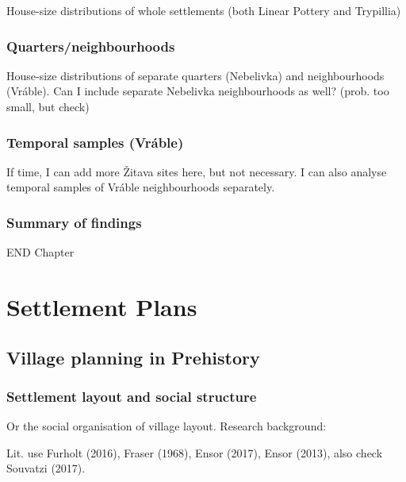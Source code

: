 \documentclass[
  12pt,
]{book}
\begin{document}
House-size distributions of whole settlements (both Linear Pottery and Trypillia)

\hypertarget{quartersneighbourhoods}{%
\section{Quarters/neighbourhoods}\label{quartersneighbourhoods}}

House-size distributions of separate quarters (Nebelivka) and neighbourhoods (Vráble). Can I include separate Nebelivka neighbourhoods as well? (prob. too small, but check)

\hypertarget{temporal-samples-vruxe1ble}{%
\section{Temporal samples (Vráble)}\label{temporal-samples-vruxe1ble}}

If time, I can add more Žitava sites here, but not necessary. I can also analyse temporal samples of Vráble neighbourhoods separately.

\hypertarget{summary-of-findings}{%
\section{Summary of findings}\label{summary-of-findings}}

END Chapter

\hypertarget{part-settlement-plans}{%
\part{Settlement Plans}\label{part-settlement-plans}}

\hypertarget{images-theory}{%
\chapter{Village planning in Prehistory}\label{images-theory}}

\hypertarget{settlement-layout-and-social-structure}{%
\section{Settlement layout and social structure}\label{settlement-layout-and-social-structure}}

Or the social organisation of village layout. Research background:

Lit. use Furholt (2016), Fraser (1968), Ensor (2017), Ensor (2013), also check Souvatzi (2017).
\end{document}
